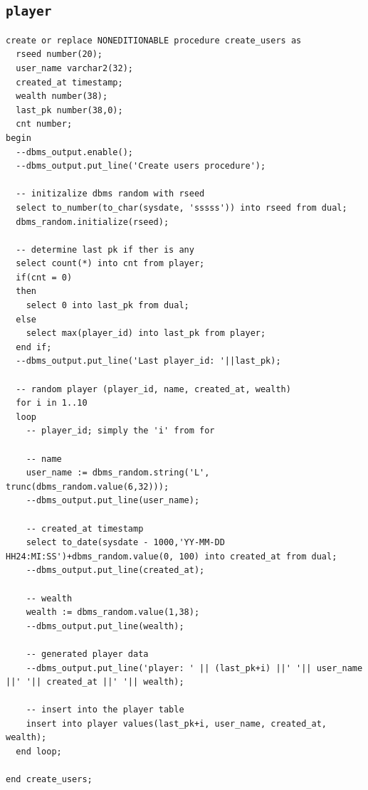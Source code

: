 \documentclass[11pt]{article}
\begin{document}
\subsection{\texttt{player}}
\label{sec:orgdba02c9}
\begin{verbatim}
create or replace NONEDITIONABLE procedure create_users as
  rseed number(20);
  user_name varchar2(32);
  created_at timestamp;
  wealth number(38);
  last_pk number(38,0);
  cnt number;
begin
  --dbms_output.enable();
  --dbms_output.put_line('Create users procedure');

  -- initizalize dbms random with rseed
  select to_number(to_char(sysdate, 'sssss')) into rseed from dual;
  dbms_random.initialize(rseed);

  -- determine last pk if ther is any
  select count(*) into cnt from player;
  if(cnt = 0)
  then
    select 0 into last_pk from dual;
  else
    select max(player_id) into last_pk from player;
  end if;
  --dbms_output.put_line('Last player_id: '||last_pk);

  -- random player (player_id, name, created_at, wealth)
  for i in 1..10
  loop
    -- player_id; simply the 'i' from for

    -- name
    user_name := dbms_random.string('L', trunc(dbms_random.value(6,32)));
    --dbms_output.put_line(user_name);

    -- created_at timestamp
    select to_date(sysdate - 1000,'YY-MM-DD HH24:MI:SS')+dbms_random.value(0, 100) into created_at from dual;
    --dbms_output.put_line(created_at);

    -- wealth
    wealth := dbms_random.value(1,38);
    --dbms_output.put_line(wealth);

    -- generated player data
    --dbms_output.put_line('player: ' || (last_pk+i) ||' '|| user_name ||' '|| created_at ||' '|| wealth);

    -- insert into the player table
    insert into player values(last_pk+i, user_name, created_at, wealth);
  end loop;

end create_users;
\end{verbatim}
\end{document}
